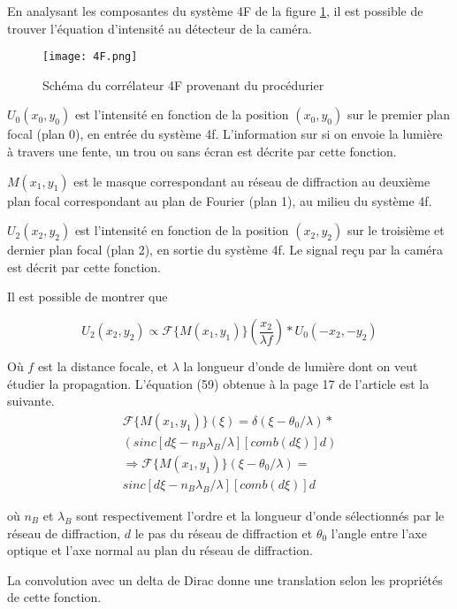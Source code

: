 \documentclass[11pt,letterpaper]{article}
\begin{document}
En analysant les composantes du système 4F de la figure \ref{4F}, il est possible de trouver l'équation d'intensité au détecteur de la caméra. 

\begin{figure}[H]
    \centering
    \texttt{[image: 4F.png]}
    \caption{Schéma du corrélateur 4F provenant du procédurier \cite{mandat}}
    \label{4F}
\end{figure}
$U_0(x_0,y_0)$ est l'intensité en fonction de la position $(x_0,y_0)$ sur le premier plan focal (plan 0), en entrée du système 4f. L'information sur si on envoie la lumière à travers une fente, un trou ou sans écran est décrite par cette fonction.

$M(x_1,y_1)$ est le masque correspondant au réseau de diffraction au deuxième plan focal correspondant au plan de Fourier (plan 1), au milieu du système 4f.

$U_2(x_2,y_2)$ est l'intensité en fonction de la position $(x_2,y_2)$ sur le troisième et dernier plan focal (plan 2), en sortie du système 4f. Le signal reçu par la caméra est décrit par cette fonction.

Il est possible de montrer que 

\begin{equation}
    U_2(x_2,y_2) \propto
    \mathcal{F}\{M(x_1,y_1)\}(\frac{x_2}{\lambda f})
    * U_0(-x_2,-y_2)
\end{equation}

Où $f$ est la distance focale, et $\lambda$ la longueur d'onde de lumière dont on veut étudier la propagation. L'équation (59) obtenue à la page 17 de l'article est la suivante.\cite{article}
\begin{align*}
    \mathcal{F}\{M(x_1,y_1)\}(\xi)= \delta(\xi-\theta_0/\lambda) * \\
    \left(sinc[d\xi-n_B\lambda_B/\lambda][comb(d\xi)]d \right)
    \\
    \Rightarrow
    \mathcal{F}\{M(x_1,y_1)\}(\xi-\theta_0/\lambda)= \\
    sinc[d\xi-n_B\lambda_B/\lambda][comb(d\xi)]d
\end{align*}


où $n_B$ et $\lambda_B$ sont respectivement l'ordre et la longueur d'onde sélectionnés par le réseau de diffraction, $d$ le pas du réseau de diffraction et $\theta_0$ l'angle entre l'axe optique et l'axe normal au plan du réseau de diffraction.

La convolution avec un delta de Dirac donne une translation selon les propriétés de cette fonction.
\end{document}
